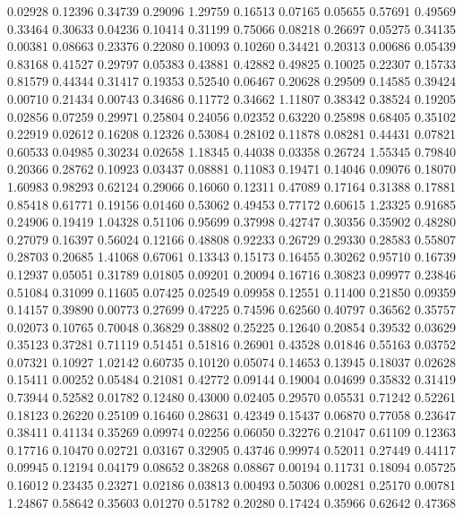  0.02928 0.12396
  0.34739 0.29096
  1.29759 0.16513
  0.07165 0.05655
  0.57691 0.49569
  0.33464 0.30633
  0.04236 0.10414
  0.31199 0.75066
  0.08218 0.26697
  0.05275 0.34135
  0.00381 0.08663
  0.23376 0.22080
  0.10093 0.10260
  0.34421 0.20313
  0.00686 0.05439
  0.83168 0.41527
  0.29797 0.05383
  0.43881 0.42882
  0.49825 0.10025
  0.22307 0.15733
  0.81579 0.44344
  0.31417 0.19353
  0.52540 0.06467
  0.20628 0.29509
  0.14585 0.39424
  0.00710 0.21434
  0.00743 0.34686
  0.11772 0.34662
  1.11807 0.38342
  0.38524 0.19205
  0.02856 0.07259
  0.29971 0.25804
  0.24056 0.02352
  0.63220 0.25898
  0.68405 0.35102
  0.22919 0.02612
  0.16208 0.12326
  0.53084 0.28102
  0.11878 0.08281
  0.44431 0.07821
  0.60533 0.04985
  0.30234 0.02658
  1.18345 0.44038
  0.03358 0.26724
  1.55345 0.79840
  0.20366 0.28762
  0.10923 0.03437
  0.08881 0.11083
  0.19471 0.14046
  0.09076 0.18070
  1.60983 0.98293
  0.62124 0.29066
  0.16060 0.12311
  0.47089 0.17164
  0.31388 0.17881
  0.85418 0.61771
  0.19156 0.01460
  0.53062 0.49453
  0.77172 0.60615
  1.23325 0.91685
  0.24906 0.19419
  1.04328 0.51106
  0.95699 0.37998
  0.42747 0.30356
  0.35902 0.48280
  0.27079 0.16397
  0.56024 0.12166
  0.48808 0.92233
  0.26729 0.29330
  0.28583 0.55807
  0.28703 0.20685
  1.41068 0.67061
  0.13343 0.15173
  0.16455 0.30262
  0.95710 0.16739
  0.12937 0.05051
  0.31789 0.01805
  0.09201 0.20094
  0.16716 0.30823
  0.09977 0.23846
  0.51084 0.31099
  0.11605 0.07425
  0.02549 0.09958
  0.12551 0.11400
  0.21850 0.09359
  0.14157 0.39890
  0.00773 0.27699
  0.47225 0.74596
  0.62560 0.40797
  0.36562 0.35757
  0.02073 0.10765
  0.70048 0.36829
  0.38802 0.25225
  0.12640 0.20854
  0.39532 0.03629
  0.35123 0.37281
  0.71119 0.51451
  0.51816 0.26901
  0.43528 0.01846
  0.55163 0.03752
  0.07321 0.10927
  1.02142 0.60735
  0.10120 0.05074
  0.14653 0.13945
  0.18037 0.02628
  0.15411 0.00252
  0.05484 0.21081
  0.42772 0.09144
  0.19004 0.04699
  0.35832 0.31419
  0.73944 0.52582
  0.01782 0.12480
  0.43000 0.02405
  0.29570 0.05531
  0.71242 0.52261
  0.18123 0.26220
  0.25109 0.16460
  0.28631 0.42349
  0.15437 0.06870
  0.77058 0.23647
  0.38411 0.41134
  0.35269 0.09974
  0.02256 0.06050
  0.32276 0.21047
  0.61109 0.12363
  0.17716 0.10470
  0.02721 0.03167
  0.32905 0.43746
  0.99974 0.52011
  0.27449 0.44117
  0.09945 0.12194
  0.04179 0.08652
  0.38268 0.08867
  0.00194 0.11731
  0.18094 0.05725
  0.16012 0.23435
  0.23271 0.02186
  0.03813 0.00493
  0.50306 0.00281
  0.25170 0.00781
  1.24867 0.58642
  0.35603 0.01270
  0.51782 0.20280
  0.17424 0.35966
  0.62642 0.47368
